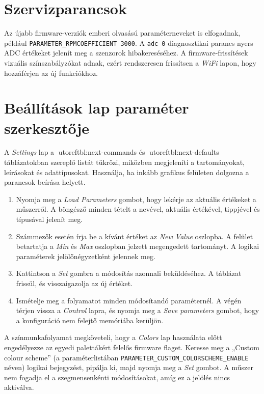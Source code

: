 \section{Szervizparancsok}
Az újabb firmware-verziók emberi olvasású paraméterneveket is elfogadnak, például \verb|PARAMETER_RPMCOEFFICIENT 3000|. A \verb|adc 0| diagnosztikai parancs nyers ADC értékeket jelenít meg a szenzorok hibakereséséhez. A firmware-frissítések vizuális színszabályzókat adnak, ezért rendszeresen frissítsen a \emph{WiFi} lapon, hogy hozzáférjen az új funkciókhoz.

\section{Beállítások lap paraméter szerkesztője}
A \emph{Settings} lap a utoref{tbl:next-commands} és utoref{tbl:next-defaults} táblázatokban szereplő listát tükrözi, miközben megjeleníti a tartományokat, leírásokat és adattípusokat. Használja, ha inkább grafikus felületen dolgozna a parancsok beírása helyett.

\begin{enumerate}
    \item Nyomja meg a \emph{Load Parameters} gombot, hogy lekérje az aktuális értékeket a műszerről. A böngésző minden tételt a nevével, aktuális értékével, tippjével és típusával jelenít meg.
    \item Számmezők esetén írja be a kívánt értéket az \emph{New Value} oszlopba. A felület betartatja a \emph{Min} és \emph{Max} oszlopban jelzett megengedett tartományt. A logikai paraméterek jelölőnégyzetként jelennek meg.
    \item Kattintson a \emph{Set} gombra a módosítás azonnali beküldéséhez. A táblázat frissül, és visszaigazolja az új értéket.
    \item Ismételje meg a folyamatot minden módosítandó paraméternél. A végén térjen vissza a \emph{Control} lapra, és nyomja meg a \emph{Save parameters} gombot, hogy a konfiguráció nem felejtő memóriába kerüljön.
\end{enumerate}

A színmunkafolyamat megköveteli, hogy a \emph{Colors} lap használata előtt engedélyezze az egyedi palettákért felelős firmware flaget. Keresse meg a „Custom colour scheme” (a paraméterlistában \verb|PARAMETER_CUSTOM_COLORSCHEME_ENABLE| néven) logikai bejegyzést, pipálja ki, majd nyomja meg a \emph{Set} gombot. A műszer nem fogadja el a szegmensenkénti módosításokat, amíg ez a jelölés nincs aktiválva.

